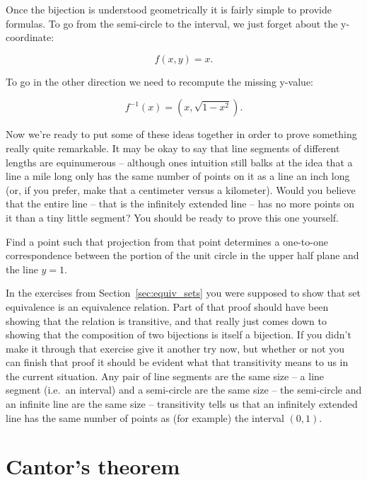 Once the bijection is understood geometrically it is fairly simple to provide
formulas.  To go from the semi-circle to the interval, we just forget
about the y-coordinate:

\[ f(x, y) = x. \]


To go in the other direction we need to recompute the missing y-value:

\[ f^{-1}(x) = (x, \sqrt{1 - x^2}).\]

Now we're ready to put some of these ideas together in order to prove
something really quite remarkable.  It may be okay to say that line segments
of different lengths are equinumerous -- although ones intuition still balks
at the idea that a line a mile long only has the same number of points on
it as a line an inch long (or, if you prefer, make that a centimeter versus
a kilometer).  Would you believe that the entire line -- that is the infinitely
extended line -- has no more points on it than a tiny little segment? You
should be ready to prove this one yourself.

\begin{exer}
Find a point such that projection from that point determines a
one-to-one correspondence between the portion of the unit circle in the upper
half plane and the line $y = 1$.  
\end{exer}

In the exercises from Section~\ref{sec:equiv_sets} you were supposed 
to show that set
equivalence is an equivalence relation.  Part of that proof should have been
showing that the relation is transitive, and that really just comes down to
showing that the composition of two bijections is itself a bijection.  If you
didn't make it through that exercise give it another try now, but whether
or not you can finish that proof it should be evident what that transitivity
means to us in the current situation.  Any pair of line segments are the same
size -- a line segment (i.e.\ an interval) and a semi-circle are the same size --
the semi-circle and an infinite line are the same size -- transitivity tells us that
an infinitely extended line has the same number of points as (for example)
the interval $(0, 1)$.

\clearpage




\newpage

\section{Cantor's theorem}
\label{sec:cantors_thm}

